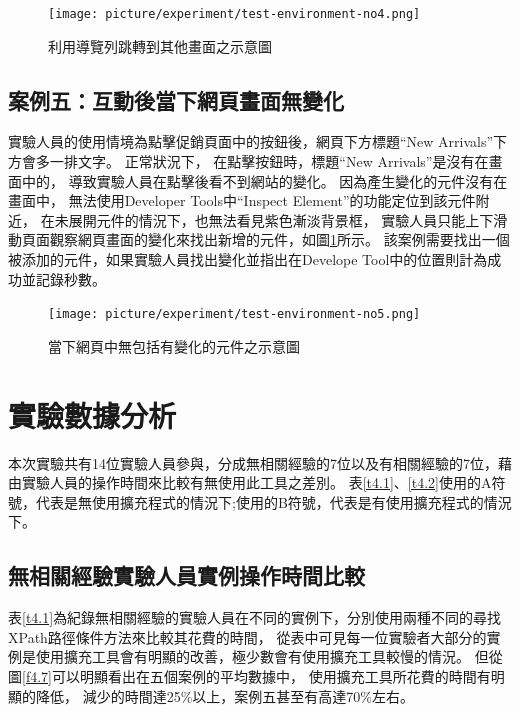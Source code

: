 \begin{figure}[H]
    \centering
    \setlength{\abovecaptionskip}{-5pt}
    \setlength{\belowcaptionskip}{0pt}
    \texttt{[image: picture/experiment/test-environment-no4.png]}
    \caption{利用導覽列跳轉到其他畫面之示意圖}
    \label{f4.5}
\end{figure}

\subsection{案例五：互動後當下網頁畫面無變化}\label{s4.2.5}
\indent
實驗人員的使用情境為點擊促銷頁面中的按鈕後，網頁下方標題``New Arrivals''下方會多一排文字。
正常狀況下，
在點擊按鈕時，標題``New Arrivals''是沒有在畫面中的，
導致實驗人員在點擊後看不到網站的變化。
因為產生變化的元件沒有在畫面中，
無法使用Developer Tools中``Inspect Element''的功能定位到該元件附近，
在未展開元件的情況下，也無法看見紫色漸淡背景框，
實驗人員只能上下滑動頁面觀察網頁畫面的變化來找出新增的元件，如圖\ref{f4.5}所示。
該案例需要找出一個被添加的元件，如果實驗人員找出變化並指出在Develope Tool中的位置則計為成功並記錄秒數。

\begin{figure}[H]
    \centering
    \setlength{\abovecaptionskip}{-5pt}
    \setlength{\belowcaptionskip}{0pt}
    \texttt{[image: picture/experiment/test-environment-no5.png]}
    \caption{當下網頁中無包括有變化的元件之示意圖}
    \label{f4.6}
\end{figure}

\newpage

\section{實驗數據分析}\label{s4.3}
\indent
本次實驗共有14位實驗人員參與，分成無相關經驗的7位以及有相關經驗的7位，藉由實驗人員的操作時間來比較有無使用此工具之差別。
表\ref{t4.1}、\ref{t4.2}使用的A符號，代表是無使用擴充程式的情況下;使用的B符號，代表是有使用擴充程式的情況下。

\subsection{無相關經驗實驗人員實例操作時間比較}\label{s4.3.1}
表\ref{t4.1}為紀錄無相關經驗的實驗人員在不同的實例下，分別使用兩種不同的尋找XPath路徑條件方法來比較其花費的時間，
從表中可見每一位實驗者大部分的實例是使用擴充工具會有明顯的改善，極少數會有使用擴充工具較慢的情況。
但從圖\ref{f4.7}可以明顯看出在五個案例的平均數據中，
使用擴充工具所花費的時間有明顯的降低，
減少的時間達25\%以上，案例五甚至有高達70\%左右。

